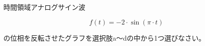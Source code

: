 時間領域アナログサイン波

\[
f(t) =-2 \cdot \sin( \pi \cdot t )
\]

\bigskip
\noindent  の位相を反転させたグラフを選択肢a〜dの中から1つ選びなさい。
